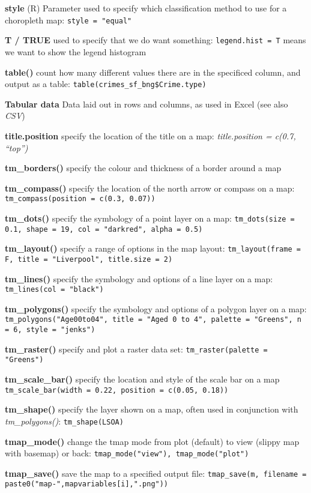 \documentclass[a4paper,10pt]{article}
\newcommand{\q}[1]{``#1''} %
\begin{document}
\begin{multicols}{2}
\textbf{style} (R) Parameter used to specify which classification method to use for a choropleth map: \texttt{style = "equal"}

\textbf{T / TRUE} used to specify that we do want something: \texttt{legend.hist = T} means we want to show the legend histogram

\textbf{table()} count how many different values there are in the specificed column, and output as a table: \texttt{table(crimes\_sf\_bng\$Crime.type)}

\textbf{Tabular data} Data laid out in rows and columns, as used in Excel (see also \textit{CSV})

\textbf{title.position} specify the location of the title on a map: \textit{title.position = c(0.7, \q{top})}

\textbf{tm\_borders()} specify the colour and thickness of a border around a map

\textbf{tm\_compass()} specify the location of the north arrow or compass on a map: \texttt{tm\_compass(position = c(0.3, 0.07))}

\textbf{tm\_dots()} specify the symbology of a point layer on a map: \texttt{tm\_dots(size = 0.1, shape = 19, col = "darkred", alpha = 0.5)}

\textbf{tm\_layout()} specify a range of options in the map layout: \texttt{tm\_layout(frame = F, title = "Liverpool", title.size = 2)}

\textbf{tm\_lines()} specify the symbology and options of a line layer on a map: \texttt{tm\_lines(col = "black")}

\textbf{tm\_polygons()} specify the symbology and options of a polygon layer on a map: \texttt{tm\_polygons("Age00to04", title = "Aged 0 to 4", palette = "Greens", n = 6, style = "jenks")}

\textbf{tm\_raster()} specify and plot a raster data set: \texttt{tm\_raster(palette = "Greens")}

\textbf{tm\_scale\_bar()} specify the location and style of the scale bar on a map \texttt{tm\_scale\_bar(width = 0.22, position = c(0.05, 0.18))}

\textbf{tm\_shape()} specify the layer shown on a map, often used in conjunction with \textit{tm\_polygons()}: \texttt{tm\_shape(LSOA)}

\textbf{tmap\_mode()} change the tmap mode from plot (default) to view (slippy map with basemap) or back: \texttt{tmap\_mode("view"),  tmap\_mode("plot")}

\textbf{tmap\_save()} save the map to a specified output file: \texttt{tmap\_save(m, filename = paste0("map-",mapvariables[i],".png"))}


\end{multicols}
\end{document}
